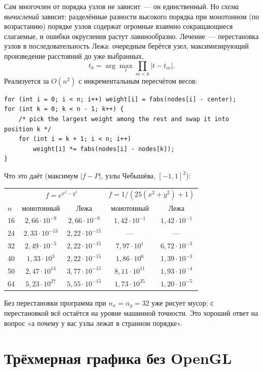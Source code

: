 \documentclass[11pt,a4paper]{report}
\begin{document}
Сам многочлен от порядка узлов не зависит~--- он единственный. Но \emph{схема
вычислений} зависит: разделённые разности высокого порядка при монотонном
(по возрастанию) порядке узлов содержат огромные взаимно сокращающиеся
слагаемые, и ошибки округления растут лавинообразно. Лечение~--- перестановка
узлов в последовательность Лежа: очередным берётся узел, максимизирующий
произведение расстояний до уже выбранных,
\[
t_{k}=\arg\max_{t}\prod_{m<k}|t-t_m| .
\]
Реализуется за $O(n^2)$ с инкрементальным пересчётом весов:
\begin{lstlisting}[style=cpp]
for (int i = 0; i < n; i++) weight[i] = fabs(nodes[i] - center);
for (int k = 0; k < n - 1; k++) {
    /* pick the largest weight among the rest and swap it into position k */
    for (int i = k + 1; i < n; i++)
        weight[i] *= fabs(nodes[i] - nodes[k]);
}
\end{lstlisting}
Что это даёт (максимум $|f-P|$, узлы Чебышёва, $[-1,1]^2$):
\begin{center}
\begin{tabular}{lcc|cc}
\toprule
& \multicolumn{2}{c|}{$f=e^{x^2-y^2}$} & \multicolumn{2}{c}{$f=1/(25(x^2+y^2)+1)$}\\
$n$ & монотонный & Лежа & монотонный & Лежа\\
\midrule
16 & $2{,}66\cdot10^{-9}$ & $2{,}66\cdot10^{-9}$ & $1{,}42\cdot10^{-1}$ & $1{,}42\cdot10^{-1}$\\
24 & $2{,}33\cdot10^{-13}$& $2{,}22\cdot10^{-15}$& --- & ---\\
32 & $2{,}49\cdot10^{-5}$ & $2{,}22\cdot10^{-15}$& $7{,}97\cdot10^{1}$ & $6{,}72\cdot10^{-3}$\\
40 & $1{,}33\cdot10^{3}$  & $2{,}22\cdot10^{-15}$& $1{,}86\cdot10^{6}$ & $1{,}39\cdot10^{-3}$\\
50 & $2{,}47\cdot10^{13}$ & $3{,}77\cdot10^{-15}$& $8{,}11\cdot10^{11}$& $1{,}93\cdot10^{-4}$\\
64 & $5{,}23\cdot10^{27}$ & $5{,}55\cdot10^{-15}$& $1{,}73\cdot10^{25}$& $1{,}20\cdot10^{-5}$\\
\bottomrule
\end{tabular}
\end{center}
Без перестановки программа при $n_x=n_y=32$ уже рисует мусор; с
перестановкой всё остаётся на уровне машинной точности. Это хороший ответ на
вопрос «а почему у вас узлы лежат в странном порядке».

\section{Трёхмерная графика без OpenGL}
\end{document}
